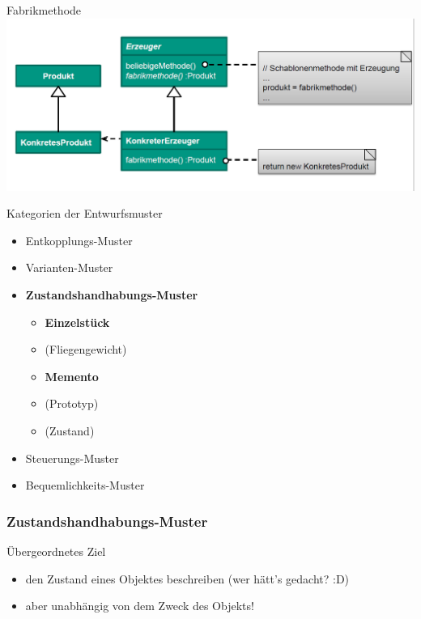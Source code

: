 \documentclass[18pt]{beamer}
\newcommand{\cmark}{\ding{51}}%
\newcommand{\correct}{\textcolor{green}{\cmark}}
\begin{document}
	\begin{frame}{Fabrikmethode}
		\includegraphics[scale=0.4]{./pics/tut4/fab.png}
	\end{frame}


	\begin{frame}{Kategorien der Entwurfsmuster}
		\begin{itemize}
			\item Entkopplungs-Muster \correct
			\item Varianten-Muster \correct
			\item \textbf{Zustandshandhabungs-Muster}
				\begin{itemize}
					\item \textbf{Einzelstück}
					\item (Fliegengewicht)
					\item \textbf{Memento} 
					\item (Prototyp) 
					\item (Zustand)
				\end{itemize}
			\item Steuerungs-Muster
			\item Bequemlichkeits-Muster
		\end{itemize}
	\end{frame}

	\begin{frame}
		\frametitle{Zustandshandhabungs-Muster}
		\begin{block}{Übergeordnetes Ziel}
			\begin{itemize}
				\item den Zustand eines Objektes beschreiben (wer hätt's gedacht? :D) \pause 
				\item aber unabhängig von dem Zweck des Objekts!
			\end{itemize}
		\end{block}
	\end{frame}
\end{document}
